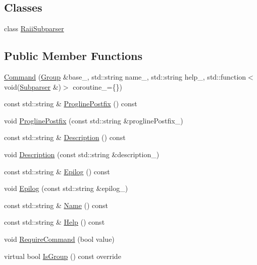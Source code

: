 \subsection*{Classes}
\begin{DoxyCompactItemize}
\item 
class \hyperlink{classargs_1_1_command_1_1_raii_subparser}{Raii\+Subparser}
\end{DoxyCompactItemize}
\subsection*{Public Member Functions}
\begin{DoxyCompactItemize}
\item 
\hyperlink{classargs_1_1_command_a181c94ddb38711478ec718ef17d4ad36}{Command} (\hyperlink{classargs_1_1_group}{Group} \&base\+\_\+, std\+::string name\+\_\+, std\+::string help\+\_\+, std\+::function$<$ void(\hyperlink{classargs_1_1_subparser}{Subparser} \&)$>$ coroutine\+\_\+=\{\})
\item 
const std\+::string \& \hyperlink{classargs_1_1_command_a19e418cd5e8ad19f168c9e0eb6216775}{Progline\+Postfix} () const
\item 
void \hyperlink{classargs_1_1_command_a806f2aa27383139b85880f42c2de56c6}{Progline\+Postfix} (const std\+::string \&progline\+Postfix\+\_\+)
\item 
const std\+::string \& \hyperlink{classargs_1_1_command_a01d237dc3c13323c143073dd2a1a2cb4}{Description} () const
\item 
void \hyperlink{classargs_1_1_command_a4ee8820d1d6d17b10a01a5cbccce1df8}{Description} (const std\+::string \&description\+\_\+)
\item 
const std\+::string \& \hyperlink{classargs_1_1_command_a874b615da38bb03c42a5fdf281ca9e32}{Epilog} () const
\item 
void \hyperlink{classargs_1_1_command_a7364bfcd513d8f345e1bab5f3371d02d}{Epilog} (const std\+::string \&epilog\+\_\+)
\item 
const std\+::string \& \hyperlink{classargs_1_1_command_a98724f5317b07197721807ab40ca8eae}{Name} () const
\item 
const std\+::string \& \hyperlink{classargs_1_1_command_a120a9143ffb5623db08c07564e1529fc}{Help} () const
\item 
void \hyperlink{classargs_1_1_command_afbbca5178a6c712f9ad0777b7bef08bd}{Require\+Command} (bool value)
\item 
virtual bool \hyperlink{classargs_1_1_command_acc75daa42b98b9be35718f072a46f13a}{Is\+Group} () const override

\end{DoxyCompactItemize}
